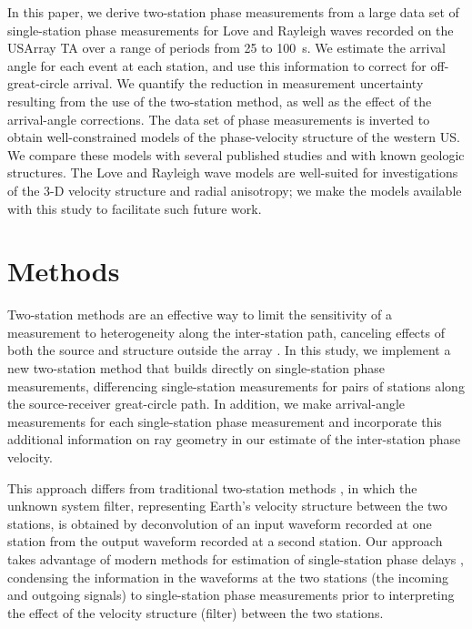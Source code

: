 \documentclass[12pt,oneside]{book}
\begin{document}
In this paper, we derive two-station phase measurements from a large data set of single-station phase measurements for Love and Rayleigh waves recorded on the USArray TA over a range of periods from 25 to 100~s. We estimate the arrival angle for each event at each station, and use this information to correct for off-great-circle arrival. We quantify the reduction in measurement uncertainty resulting from the use of the two-station method, as well as the effect of the arrival-angle corrections. The data set of phase measurements is inverted to obtain well-constrained models of the phase-velocity structure of the western US. We compare these models with several published studies and with known geologic structures. The Love and Rayleigh wave models are well-suited for investigations of the 3\nobreakdash-D velocity structure and radial anisotropy; we make the models available with this study to facilitate such future work. 

\section{Methods}
Two-station methods are an effective way to limit the sensitivity of a measurement to heterogeneity along the inter-station path, canceling effects of both the source and structure outside the array \citep[e.g.,][]{Brisbourne1998}. In this study, we implement a new two-station method that builds directly on single-station phase measurements, differencing single-station measurements for pairs of stations along the source-receiver great-circle path. In addition, we make arrival-angle measurements for each single-station phase measurement and incorporate this additional information on ray geometry in our estimate of the inter-station phase velocity. 

This approach differs from traditional two-station methods \citep[e.g.,][]{Sato1955, Brune1963, Pilant1964, Knopoff1966, Bloch1968}, in which the unknown system filter, representing Earth's velocity structure between the two stations, is obtained by deconvolution of an input waveform recorded at one station from the output waveform recorded at a second station. Our approach takes advantage of modern methods for estimation of single-station phase delays \citep[e.g.,][]{Trampert1995, Ekstrom1997}, condensing the information in the waveforms at the two stations (the incoming and outgoing signals) to single-station phase measurements prior to interpreting the effect of the velocity structure (filter) between the two stations.
\end{document}
